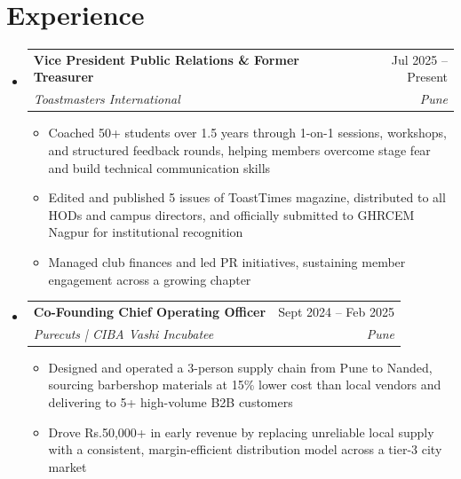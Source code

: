 \documentclass[letterpaper,10pt]{article}
\makeatletter
\newcommand{\resumeItem}[1]{
  \item\small{
    {#1 \vspace{-2pt}}
  }
}
\newcommand{\resumeSubheading}[4]{
  \vspace{-2pt}\item
    \begin{tabular*}{0.97\textwidth}[t]{l@{\extracolsep{\fill}}r}
      \textbf{#1} & #2 \\
      \textit{\small#3} & \textit{\small #4} \\
    \end{tabular*}\vspace{-7pt}
}
\newcommand{\resumeSubHeadingListStart}{\begin{itemize}[leftmargin=0.15in, label={}]}
\newcommand{\resumeSubHeadingListEnd}{\end{itemize}}
\newcommand{\resumeItemListStart}{\begin{itemize}}
\newcommand{\resumeItemListEnd}{\end{itemize}\vspace{-5pt}}
\makeatother
\begin{document}
\section{Experience}
  \resumeSubHeadingListStart
    \resumeSubheading{Vice President Public Relations \& Former Treasurer}{Jul 2025 -- Present}{Toastmasters International}{Pune}
    \resumeItemListStart
      \resumeItem{Coached 50+ students over 1.5 years through 1-on-1 sessions, workshops, and structured feedback rounds, helping members overcome stage fear and build technical communication skills}
      \resumeItem{Edited and published 5 issues of ToastTimes magazine, distributed to all HODs and campus directors, and officially submitted to GHRCEM Nagpur for institutional recognition}
      \resumeItem{Managed club finances and led PR initiatives, sustaining member engagement across a growing chapter}
    \resumeItemListEnd
\resumeSubheading{Co-Founding Chief Operating Officer}{Sept 2024 -- Feb 2025}{Purecuts | CIBA Vashi Incubatee}{Pune}
    \resumeItemListStart
      \resumeItem{Designed and operated a 3-person supply chain from Pune to Nanded, sourcing barbershop materials at 15\% lower cost than local vendors and delivering to 5+ high-volume B2B customers}
      \resumeItem{Drove Rs.50,000+ in early revenue by replacing unreliable local supply with a consistent, margin-efficient distribution model across a tier-3 city market}
    \resumeItemListEnd
  \resumeSubHeadingListEnd

\end{document}
